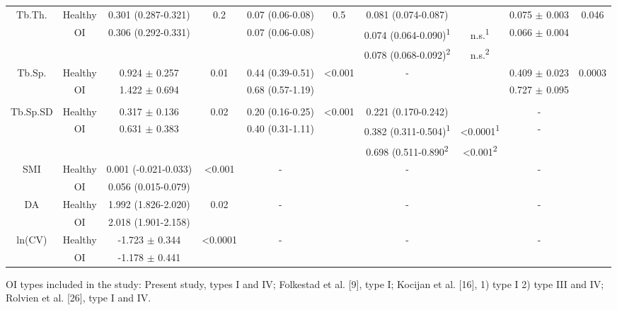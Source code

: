 \documentclass{AR2RC}
\begin{document}
\begin{sidewaystable*}
{\begin{tabular}{cccccccccc}
		\multirow{3}{*}{Tb.Th.} & Healthy & 0.301 (0.287-0.321) & 0.2 & 0.07 (0.06-0.08) & 0.5 & 0.081 (0.074-0.087) & & 0.075 $\pm$ 0.003 & 0.046 \\
		& \multirow{2}{*}{OI} & \multirow{2}{*}{0.306 (0.292-0.331)} &  & 0.07 (0.06-0.08) &  & 0.074 (0.064-0.090)\textsuperscript{1} & n.s.\textsuperscript{1} & \multirow{2}{*}{0.066 $\pm$ 0.004} & \\
		& & & & & & 0.078 (0.068-0.092)\textsuperscript{2} & n.s.\textsuperscript{2} & & \\[3ex]
		
		\multirow{3}{*}{Tb.Sp.} & Healthy & 0.924 $\pm$ 0.257 & 0.01 & 0.44 (0.39-0.51) & <0.001 & \multirow{3}{*}{-} & & 0.409 $\pm$ 0.023 & 0.0003 \\
		& \multirow{2}{*}{OI} & \multirow{2}{*}{1.422 $\pm$ 0.694} &  & 0.68 (0.57-1.19) &  & &  & \multirow{2}{*}{0.727 $\pm$ 0.095} & \\
		& & & & & & &  & & \\[3ex]
		
		\multirow{3}{*}{Tb.Sp.SD} & Healthy & 0.317 $\pm$ 0.136 & 0.02 & 0.20 (0.16-0.25) & <0.001 & 0.221 (0.170-0.242) & & - &  \\
		& \multirow{2}{*}{OI} & \multirow{2}{*}{0.631 $\pm$ 0.383} &  & 0.40 (0.31-1.11) &  & 0.382 (0.311-0.504)\textsuperscript{1} & <0.0001\textsuperscript{1} & - & \\
		& & & & & & 0.698 (0.511-0.890\textsuperscript{2} & <0.001\textsuperscript{2} & & \\[3ex]
		
		\multirow{3}{*}{SMI} & Healthy & 0.001 (-0.021-0.033) & <0.001 & \multirow{3}{*}{-} &  & \multirow{3}{*}{-} & & \multirow{3}{*}{-} &  \\
		& \multirow{2}{*}{OI} & \multirow{2}{*}{0.056 (0.015-0.079)} & & & & &  & & \\
		& & & & & & & & & \\[3ex]
		
		\multirow{3}{*}{DA} & Healthy & 1.992 (1.826-2.020) & 0.02 & \multirow{3}{*}{-} & & \multirow{3}{*}{-} & & \multirow{3}{*}{-} &  \\
		& \multirow{2}{*}{OI} & \multirow{2}{*}{2.018 (1.901-2.158)} & & & & & & & \\
		& & & & & & & & & \\[3ex]
		
		\multirow{3}{*}{ln(CV)} & Healthy & -1.723 $\pm$ 0.344 & <0.0001 & \multirow{3}{*}{-} & & \multirow{3}{*}{-} & & \multirow{3}{*}{-} &  \\
		& \multirow{2}{*}{OI} & \multirow{2}{*}{-1.178 $\pm$ 0.441} & & & & & & & \\
		& & & & & & & & & \\
		
		\bottomrule
	\end{tabular}}
	OI types included in the study: Present study, types I and IV; Folkestad et al. [9], type I; Kocijan et al. [16], 1) type I 2) type III and IV; Rolvien et al. [26], type I and IV.
\end{sidewaystable*}
\end{document}
